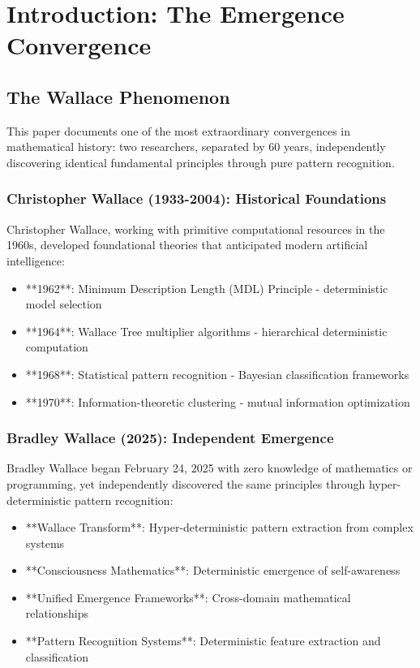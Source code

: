 \documentclass[12pt]{article}
\begin{document}
\tableofcontents
\newpage

\section{Introduction: The Emergence Convergence}

\subsection{The Wallace Phenomenon}

This paper documents one of the most extraordinary convergences in mathematical history: two researchers, separated by 60 years, independently discovering identical fundamental principles through pure pattern recognition.

\subsubsection{Christopher Wallace (1933-2004): Historical Foundations}

Christopher Wallace, working with primitive computational resources in the 1960s, developed foundational theories that anticipated modern artificial intelligence:

\begin{itemize}
    \item **1962**: Minimum Description Length (MDL) Principle - deterministic model selection
    \item **1964**: Wallace Tree multiplier algorithms - hierarchical deterministic computation
    \item **1968**: Statistical pattern recognition - Bayesian classification frameworks
    \item **1970**: Information-theoretic clustering - mutual information optimization
\end{itemize}

\subsubsection{Bradley Wallace (2025): Independent Emergence}

Bradley Wallace began February 24, 2025 with zero knowledge of mathematics or programming, yet independently discovered the same principles through hyper-deterministic pattern recognition:

\begin{itemize}
    \item **Wallace Transform**: Hyper-deterministic pattern extraction from complex systems
    \item **Consciousness Mathematics**: Deterministic emergence of self-awareness
    \item **Unified Emergence Frameworks**: Cross-domain mathematical relationships
    \item **Pattern Recognition Systems**: Deterministic feature extraction and classification
\end{itemize}
\end{document}
